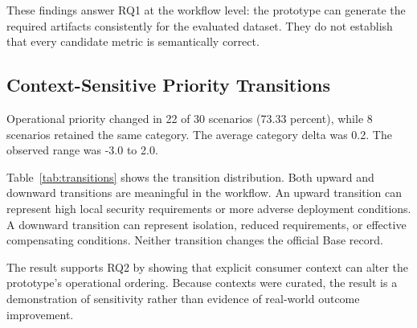 \documentclass[conference]{IEEEtran}
\begin{document}
These findings answer RQ1 at the workflow level: the prototype can generate
the required artifacts consistently for the evaluated dataset. They do not
establish that every candidate metric is semantically correct.

\subsection{Context-Sensitive Priority Transitions}

Operational priority changed in 22 of 30
scenarios (73.33 percent), while 8 scenarios retained
the same category. The average category delta was 0.2. The
observed range was -3.0 to 2.0.

Table~\ref{tab:transitions} shows the transition distribution. Both upward and
downward transitions are meaningful in the workflow. An upward transition can
represent high local security requirements or more adverse deployment
conditions. A downward transition can represent isolation, reduced
requirements, or effective compensating conditions. Neither transition
changes the official Base record.

\begin{table}[t]
\caption{Operational Priority Transitions}
\label{tab:transitions}
\centering
\scriptsize
{}
\end{table}

The result supports RQ2 by showing that explicit consumer context can alter the
prototype's operational ordering. Because contexts were curated, the result is
a demonstration of sensitivity rather than evidence of real-world outcome
improvement.
\end{document}
